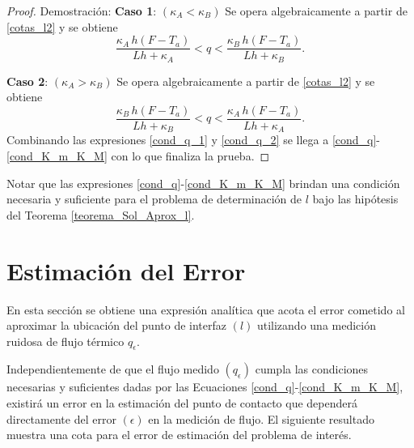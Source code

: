 \begin{proof}{Demostraci\'on:}
\textbf{Caso 1}:  $(\kappa_A < \kappa_B)$
Se opera algebraicamente a partir de \eqref{cotas_l2} y se obtiene
%
\begin{equation}
\label{cond_q_1}
\dfrac{\kappa_A \, h (F-T_a)}{Lh+\kappa_A}<q<\dfrac{\kappa_B \, h (F-T_a)}{Lh+\kappa_B}.
\end{equation}
%

\textbf{Caso 2}:  $(\kappa_A > \kappa_B)$
Se opera algebraicamente a partir de \eqref{cotas_l2} y se obtiene 
%
\begin{equation}
\label{cond_q_2}
\dfrac{\kappa_B \, h (F-T_a)}{Lh+\kappa_B}<q<\dfrac{\kappa_A \, h (F-T_a)}{Lh+\kappa_A}.
\end{equation}
%
Combinando las expresiones \eqref{cond_q_1} y \eqref{cond_q_2} se llega a \eqref{cond_q}-\eqref{cond_K_m_K_M} con lo que finaliza la prueba. 
%
\end{proof}
%
\begin{rem}
Notar que las expresiones \eqref{cond_q}-\eqref{cond_K_m_K_M} brindan una condici\'on necesaria y suficiente para el problema de determinaci\'on de $l$ bajo las hip\'otesis del Teorema \ref{teorema_Sol_Aprox_l}. 
\end{rem}
%
\section{Estimaci\'on del Error} \label{sec:Error7}
%
En esta secci\'on se obtiene una expresi\'on anal\'itica que acota el error cometido al aproximar la ubicaci\'on del punto de interfaz $(l)$ utilizando una medici\'on 
ruidosa de flujo t\'ermico $q_\epsilon$.

Independientemente de que el flujo medido $(q_\epsilon)$ cumpla las condiciones necesarias y suficientes dadas por las Ecuaciones \eqref{cond_q}-\eqref{cond_K_m_K_M},
existir\'a un error en la estimaci\'on
del punto de contacto que depender\'a directamente del error $(\epsilon)$ en la medici\'on de flujo. 
El siguiente resultado muestra una cota para el error de estimaci\'on del problema de inter\'es. 

